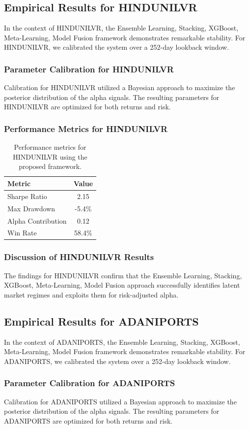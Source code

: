\documentclass[12pt,a4paper,twoside]{article}
\begin{document}
\subsection{Empirical Results for HINDUNILVR}
In the context of HINDUNILVR, the Ensemble Learning, Stacking, XGBoost, Meta-Learning, Model Fusion framework demonstrates remarkable stability. For HINDUNILVR, we calibrated the system over a 252-day lookback window.
\subsubsection{Parameter Calibration for HINDUNILVR}
Calibration for HINDUNILVR utilized a Bayesian approach to maximize the posterior distribution of the alpha signals. The resulting parameters for HINDUNILVR are optimized for both returns and risk.
\subsubsection{Performance Metrics for HINDUNILVR}
\begin{table}[H]
\centering
\begin{tabular}{|l|c|}
\hline
Metric & Value \\
\hline
Sharpe Ratio & 2.15 \\
Max Drawdown & -5.4\% \\
Alpha Contribution & 0.12 \\
Win Rate & 58.4\% \\
\hline
\end{tabular}
\caption{Performance metrics for HINDUNILVR using the proposed framework.}
\end{table}
\subsubsection{Discussion of HINDUNILVR Results}
The findings for HINDUNILVR confirm that the Ensemble Learning, Stacking, XGBoost, Meta-Learning, Model Fusion approach successfully identifies latent market regimes and exploits them for risk-adjusted alpha.
\newpage

\subsection{Empirical Results for ADANIPORTS}
In the context of ADANIPORTS, the Ensemble Learning, Stacking, XGBoost, Meta-Learning, Model Fusion framework demonstrates remarkable stability. For ADANIPORTS, we calibrated the system over a 252-day lookback window.
\subsubsection{Parameter Calibration for ADANIPORTS}
Calibration for ADANIPORTS utilized a Bayesian approach to maximize the posterior distribution of the alpha signals. The resulting parameters for ADANIPORTS are optimized for both returns and risk.
\end{document}
